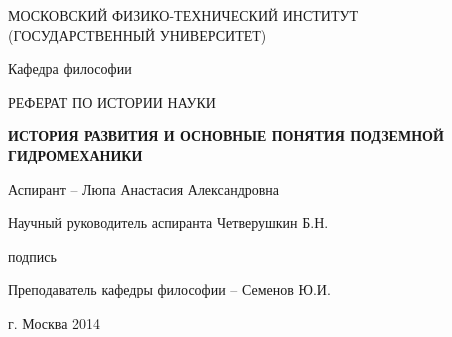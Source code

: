 \begin{titlepage}
\begin{center}
\vspace{7mm}
{МОСКОВСКИЙ ФИЗИКО-ТЕХНИЧЕСКИЙ ИНСТИТУТ \\
(ГОСУДАРСТВЕННЫЙ УНИВЕРСИТЕТ)} \\
\vspace{45mm}
{Кафедра философии \par}
\vspace{20mm}
{РЕФЕРАТ ПО ИСТОРИИ НАУКИ \par}
\vspace{15mm}
{\bf \large ИСТОРИЯ РАЗВИТИЯ И ОСНОВНЫЕ ПОНЯТИЯ ПОДЗЕМНОЙ ГИДРОМЕХАНИКИ \par}

\end{center}

\vspace{35mm}
\hspace{15mm}
{Аспирант -- Люпа Анастасия Александровна\par}
\vspace{10mm}
\hspace{15mm}
{Научный руководитель аспиранта \underline{\hspace{2.5cm}} Четверушкин Б.Н.\par}
\hspace{100mm}
{\tiny подпись\par}
\vspace{8mm}
\hspace{15mm}
{Преподаватель кафедры философии --  Семенов Ю.И.\par}

\vspace{\fill}

\begin{center}
{г. Москва 2014}
\end{center}

\clearpage
\end{titlepage}
\newpage